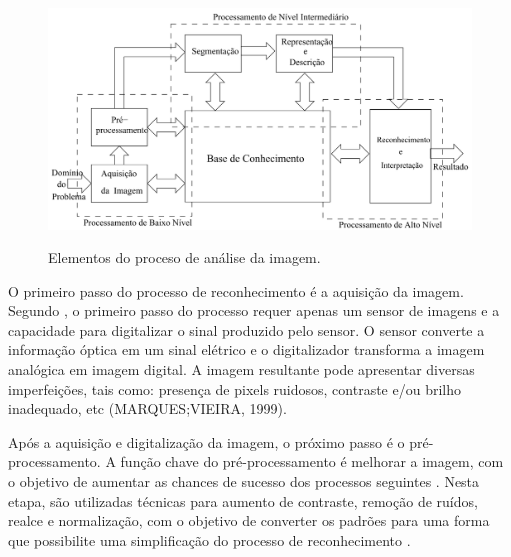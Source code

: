  \begin{figure}[h]
	\centering
	\includegraphics[width=1.0\textwidth]{Imagens/imagem5} %
	\caption[Elementos do processo de análise de imagem.]{Elementos do proceso de análise da imagem. }
	\label{fig:tux_laplace}
\end{figure}




O primeiro passo do processo de reconhecimento é a aquisição da imagem. Segundo , o primeiro passo do processo requer apenas um sensor de imagens e a capacidade para digitalizar o sinal produzido pelo
sensor. O sensor converte a informação óptica em um sinal elétrico e o digitalizador transforma a imagem analógica em imagem digital. A imagem resultante pode apresentar diversas imperfeições, tais como: presença de pixels ruidosos, contraste e/ou brilho inadequado, etc (MARQUES;VIEIRA, 1999).

Após a aquisição e digitalização da imagem, o próximo passo é o pré-processamento. A função chave do pré-processamento é melhorar a imagem, com o objetivo de aumentar as chances de sucesso dos processos seguintes \cite{GONZALEZ1992}. Nesta etapa, são utilizadas técnicas para aumento de contraste, remoção de ruídos, realce e normalização, com o objetivo de converter os padrões para uma forma que possibilite uma simplificação do processo de reconhecimento \cite{Rodrigues2002}.

